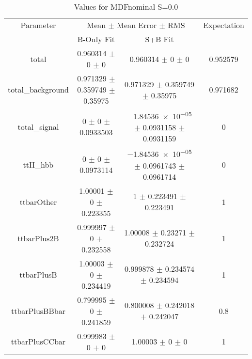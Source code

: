 \begin{table}
\centering
\caption{Values for MDFnominal S=0.0}
\begin{tabular}{cccc}
\toprule
Parameter & \multicolumn{2}{c}{Mean $\pm$ Mean Error $\pm$ RMS} & Expectation\\
 & B-Only Fit & S+B Fit & \\
\midrule
total & \num{0.960314} $\pm$ \num{0} $\pm$ \num{0} & \num{0.960314} $\pm$ \num{0} $\pm$ \num{0} & \num{0.952579}\\
total\_background & \num{0.971329} $\pm$ \num{0.359749} $\pm$ \num{0.35975} & \num{0.971329} $\pm$ \num{0.359749} $\pm$ \num{0.35975} & \num{0.971682}\\
total\_signal & \num{0} $\pm$ \num{0} $\pm$ \num{0.0933503} & \num{-1.84536e-05} $\pm$ \num{0.0931158} $\pm$ \num{0.0931159} & \num{0}\\
ttH\_hbb & \num{0} $\pm$ \num{0} $\pm$ \num{0.0973114} & \num{-1.84536e-05} $\pm$ \num{0.0961743} $\pm$ \num{0.0961714} & \num{0}\\
ttbarOther & \num{1.00001} $\pm$ \num{0} $\pm$ \num{0.223355} & \num{1} $\pm$ \num{0.223491} $\pm$ \num{0.223491} & \num{1}\\
ttbarPlus2B & \num{0.999997} $\pm$ \num{0} $\pm$ \num{0.232558} & \num{1.00008} $\pm$ \num{0.23271} $\pm$ \num{0.232724} & \num{1}\\
ttbarPlusB & \num{1.00003} $\pm$ \num{0} $\pm$ \num{0.234419} & \num{0.999878} $\pm$ \num{0.234574} $\pm$ \num{0.234594} & \num{1}\\
ttbarPlusBBbar & \num{0.799995} $\pm$ \num{0} $\pm$ \num{0.241859} & \num{0.800008} $\pm$ \num{0.242018} $\pm$ \num{0.242047} & \num{0.8}\\
ttbarPlusCCbar & \num{0.999983} $\pm$ \num{0} $\pm$ \num{0} & \num{1.00003} $\pm$ \num{0} $\pm$ \num{0} & \num{1}\\
\bottomrule
\end{tabular}
\end{table}